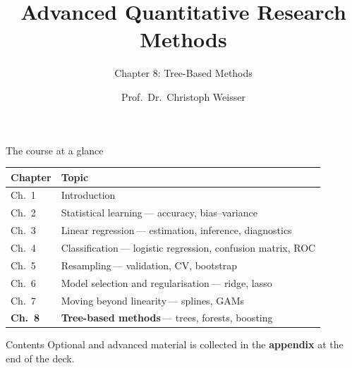 \documentclass[aspectratio=169,11pt]{beamer}
\title{Advanced Quantitative Research Methods}
\subtitle{Chapter 8: Tree-Based Methods}
\author{Prof.\ Dr.\ Christoph Weisser}
\date{}\graphicspath{{images/}}
\begin{document}
\begin{frame}[plain]\titlepage\end{frame}

\begin{frame}{The course at a glance}
  \vspace{-1.5mm}
  \begin{center}
  \scriptsize
  \setlength{\tabcolsep}{5pt}
  \renewcommand{\arraystretch}{1.30}
  \begin{tabular}{@{\hspace{2pt}}l >{\raggedright\arraybackslash}p{}@{\hspace{2pt}}}
    \toprule
    \textbf{Chapter} & \textbf{Topic} \\
    \midrule
     {\color{accent}Ch.\ 1} & Introduction \\
    \rowcolor{black!3} {\color{accent}Ch.\ 2} & Statistical learning\,{\color{black!45}--- accuracy, bias--variance} \\
     {\color{accent}Ch.\ 3} & Linear regression\,{\color{black!45}--- estimation, inference, diagnostics} \\
    \rowcolor{black!3} {\color{accent}Ch.\ 4} & Classification\,{\color{black!45}--- logistic regression, confusion matrix, ROC} \\
     {\color{accent}Ch.\ 5} & Resampling\,{\color{black!45}--- validation, CV, bootstrap} \\
    \rowcolor{black!3} {\color{accent}Ch.\ 6} & Model selection and regularisation\,{\color{black!45}--- ridge, lasso} \\
     {\color{accent}Ch.\ 7} & Moving beyond linearity\,{\color{black!45}--- splines, GAMs} \\
    \rowcolor{accent!18} \textbf{Ch.\ 8} & \textbf{Tree-based methods}\,{\color{accent!75!black}--- trees, forests, boosting} \\
    \bottomrule
  \end{tabular}
  \end{center}
\end{frame}


\begin{frame}{Contents}\small
  \tableofcontents[hideallsubsections]
  \vfill
  {\tiny Optional and advanced material is collected in the \textbf{appendix} at the end of the deck.}
\end{frame}
\end{document}
